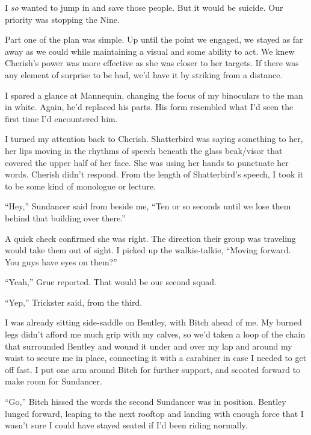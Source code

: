 I \emph{so} wanted to jump in and save those people.  But it would be suicide.  Our priority was stopping the Nine.



Part one of the plan was simple.  Up until the point we engaged, we stayed as far away as we could while maintaining a visual and some ability to act.  We knew Cherish's power was more effective as she was closer to her targets.  If there was any element of surprise to be had, we'd have it by striking from a distance.



I spared a glance at Mannequin, changing the focus of my binoculars to the man in white.  Again, he'd replaced his parts.  His form resembled what I'd seen the first time I'd encountered him.



I turned my attention back to Cherish.  Shatterbird was saying something to her, her lips moving in the rhythms of speech beneath the glass beak/visor that covered the upper half of her face.  She was using her hands to punctuate her words.  Cherish didn't respond.  From the length of Shatterbird's speech, I took it to be some kind of monologue or lecture.



``Hey,'' Sundancer said from beside me, ``Ten or so seconds until we lose them behind that building over there.''



A quick check confirmed she was right.  The direction their group was traveling would take them out of sight.  I picked up the walkie-talkie, ``Moving forward.  You guys have eyes on them?''



``Yeah,'' Grue reported.  That would be our second squad.



``Yep,'' Trickster said, from the third.



I was already sitting side-saddle on Bentley, with Bitch ahead of me.  My burned legs didn't afford me much grip with my calves, so we'd taken a loop of the chain that surrounded Bentley and wound it under and over my lap and around my waist to secure me in place, connecting it with a carabiner in case I needed to get off fast.  I put one arm around Bitch for further support, and scooted forward to make room for Sundancer.



``Go,'' Bitch hissed the words the second Sundancer was in position.  Bentley lunged forward, leaping to the next rooftop and landing with enough force that I wasn't sure I could have stayed seated if I'd been riding normally.



